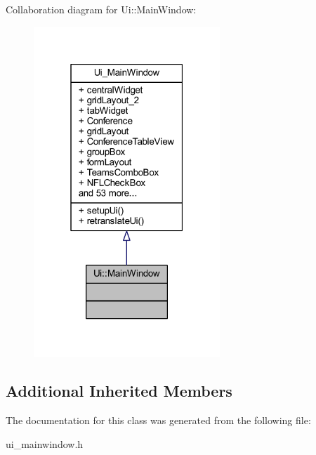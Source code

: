 Collaboration diagram for Ui\+:\+:Main\+Window\+:
\nopagebreak
\begin{figure}[H]
\begin{center}
\leavevmode
\includegraphics[width=199pt]{class_ui_1_1_main_window__coll__graph}
\end{center}
\end{figure}
\subsection*{Additional Inherited Members}


The documentation for this class was generated from the following file\+:\begin{DoxyCompactItemize}
\item 
ui\+\_\+mainwindow.\+h\end{DoxyCompactItemize}
